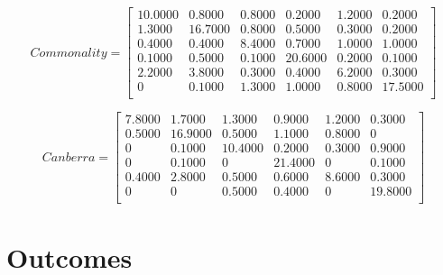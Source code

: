 \documentclass[a4paper,12pt,oneside,final]{report}
\begin{document}
\[
Commonality = \left[\begin{array}{cccccc}
   10.0000 &   0.8000  &  0.8000 &   0.2000  &  1.2000  &  0.2000\\
    1.3000 &  16.7000  &  0.8000 &   0.5000  &  0.3000  &  0.2000\\
    0.4000 &   0.4000  &  8.4000 &   0.7000  &  1.0000  &  1.0000\\
    0.1000 &   0.5000  &  0.1000 &  20.6000  &  0.2000  &  0.1000\\
    2.2000 &   3.8000  &  0.3000 &   0.4000  &  6.2000  &  0.3000\\
         0 &   0.1000  &  1.3000 &   1.0000  &  0.8000  & 17.5000\\
\end{array}
\right]
\]

\[
Canberra = \left[\begin{array}{cccccc}
7.8000  &  1.7000 &   1.3000  &  0.9000  &  1.2000 &   0.3000 \\
    0.5000 &  16.9000 &   0.5000 &   1.1000   & 0.8000  &       0 \\
         0 &   0.1000 &  10.4000 &   0.2000   & 0.3000  &  0.9000 \\
         0 &   0.1000 &        0 &  21.4000   &      0  &  0.1000 \\
    0.4000 &   2.8000 &   0.5000 &   0.6000   & 8.6000  &  0.3000 \\
         0 &        0 &   0.5000 &   0.4000   &      0  & 19.8000 \\
\end{array}
\right]
\]

\chapter{Outcomes}
\end{document}

